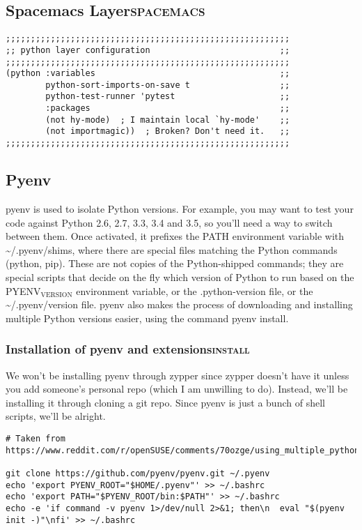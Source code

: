 \documentclass[11pt]{article}
\begin{document}
\subsection{Spacemacs Layer\hfill{}\textsc{spacemacs}}
\label{sec:org71e1783}
\begin{verbatim}
;;;;;;;;;;;;;;;;;;;;;;;;;;;;;;;;;;;;;;;;;;;;;;;;;;;;;;;;;
;; python layer configuration                          ;;
;;;;;;;;;;;;;;;;;;;;;;;;;;;;;;;;;;;;;;;;;;;;;;;;;;;;;;;;;
(python :variables                                     ;;
        python-sort-imports-on-save t                  ;;
        python-test-runner 'pytest                     ;;
        :packages                                      ;;
        (not hy-mode)  ; I maintain local `hy-mode'    ;;
        (not importmagic))  ; Broken? Don't need it.   ;;
;;;;;;;;;;;;;;;;;;;;;;;;;;;;;;;;;;;;;;;;;;;;;;;;;;;;;;;;;
\end{verbatim}
\subsection{Pyenv}
\label{sec:orgb73b4bb}
pyenv is used to isolate Python versions. For example, you may want to test your code against Python 2.6, 2.7, 3.3, 3.4 and 3.5, so you'll need a way to switch between them. Once activated, it prefixes the PATH environment variable with \textasciitilde{}/.pyenv/shims, where there are special files matching the Python commands (python, pip). These are not copies of the Python-shipped commands; they are special scripts that decide on the fly which version of Python to run based on the PYENV\(_{\text{VERSION}}\) environment variable, or the .python-version file, or the \textasciitilde{}/.pyenv/version file. pyenv also makes the process of downloading and installing multiple Python versions easier, using the command pyenv install.

\subsubsection{Installation of pyenv and extensions\hfill{}\textsc{install}}
\label{sec:org5cc6872}

We won't be installing pyenv through zypper since zypper doesn't have it unless you add someone's personal repo (which I am unwilling to do).
Instead, we'll be installing it through cloning a git repo. Since pyenv is just a bunch of shell scripts, we'll be alright.

\begin{verbatim}
# Taken from https://www.reddit.com/r/openSUSE/comments/70ozge/using_multiple_python_versions_on_leap/dos6798

git clone https://github.com/pyenv/pyenv.git ~/.pyenv
echo 'export PYENV_ROOT="$HOME/.pyenv"' >> ~/.bashrc
echo 'export PATH="$PYENV_ROOT/bin:$PATH"' >> ~/.bashrc
echo -e 'if command -v pyenv 1>/dev/null 2>&1; then\n  eval "$(pyenv init -)"\nfi' >> ~/.bashrc
\end{verbatim}
\end{document}
